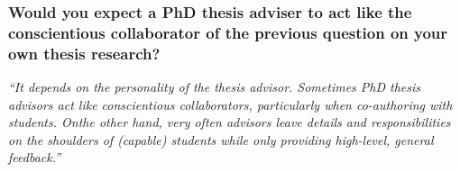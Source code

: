\documentclass[12pt]{beamer}
\newcommand\ans[1]{{\it ``#1''}}
\begin{document}
\begin{frame} %
\frametitle{Would you expect a PhD thesis adviser to act like the conscientious collaborator of the previous question on your own thesis research?}


\ans{It depends on the personality of the thesis advisor.  Sometimes PhD thesis advisors act like conscientious collaborators, particularly when co-authoring with students.  Onthe other hand, very often advisors leave details and responsibilities on the shoulders of (capable) students while only providing high-level, general feedback.}












\end{frame}
\end{document}
